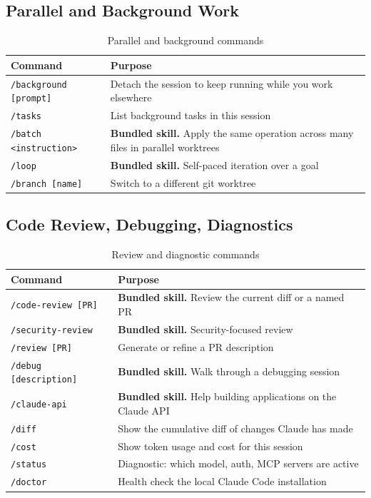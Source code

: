 \subsection{Parallel and Background Work}

\begin{table}[ht]
\centering
\caption{Parallel and background commands}
\label{tab:cmd-parallel}
\begin{tabularx}{\textwidth}{lX}
\toprule
\textbf{Command} & \textbf{Purpose} \\
\midrule
\texttt{/background [prompt]} & Detach the session to keep running while you work elsewhere \\
\texttt{/tasks}              & List background tasks in this session \\
\texttt{/batch <instruction>}& \textbf{Bundled skill.} Apply the same operation across many files in parallel worktrees \\
\texttt{/loop}               & \textbf{Bundled skill.} Self-paced iteration over a goal \\
\texttt{/branch [name]}      & Switch to a different git worktree \\
\bottomrule
\end{tabularx}
\end{table}

\subsection{Code Review, Debugging, Diagnostics}

\begin{table}[ht]
\centering
\caption{Review and diagnostic commands}
\label{tab:cmd-review}
\begin{tabularx}{\textwidth}{lX}
\toprule
\textbf{Command} & \textbf{Purpose} \\
\midrule
\texttt{/code-review [PR]}   & \textbf{Bundled skill.} Review the current diff or a named PR \\
\texttt{/security-review}    & \textbf{Bundled skill.} Security-focused review \\
\texttt{/review [PR]}        & Generate or refine a PR description \\
\texttt{/debug [description]}& \textbf{Bundled skill.} Walk through a debugging session \\
\texttt{/claude-api}         & \textbf{Bundled skill.} Help building applications on the Claude API \\
\texttt{/diff}               & Show the cumulative diff of changes Claude has made \\
\texttt{/cost}               & Show token usage and cost for this session \\
\texttt{/status}             & Diagnostic: which model, auth, MCP servers are active \\
\texttt{/doctor}             & Health check the local Claude Code installation \\
\bottomrule
\end{tabularx}
\end{table}

